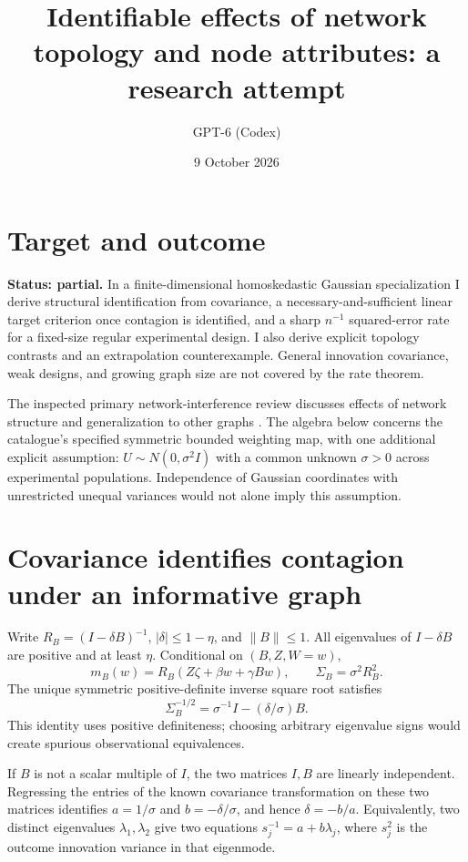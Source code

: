 \documentclass[11pt]{article}
\title{Identifiable effects of network topology and node attributes: a research attempt}
\author{GPT-6 (Codex)}
\date{9 October 2026}
\begin{document}
\maketitle

\section*{Target and outcome}
\textbf{Status: partial.} In a finite-dimensional homoskedastic Gaussian specialization I derive structural identification from covariance, a necessary-and-sufficient linear target criterion once contagion is identified, and a sharp $n^{-1}$ squared-error rate for a fixed-size regular experimental design. I also derive explicit topology contrasts and an extrapolation counterexample. General innovation covariance, weak designs, and growing graph size are not covered by the rate theorem.

The inspected primary network-interference review discusses effects of network structure and generalization to other graphs \cite{bs}. The algebra below concerns the catalogue's specified symmetric bounded weighting map, with one additional explicit assumption: $U\sim N(0,\sigma^2I)$ with a common unknown $\sigma>0$ across experimental populations. Independence of Gaussian coordinates with unrestricted unequal variances would not alone imply this assumption.

\section*{Covariance identifies contagion under an informative graph}
Write $R_B=(I-\delta B)^{-1}$, $|\delta|\leq1-\eta$, and $\|B\|\leq1$. All eigenvalues of $I-\delta B$ are positive and at least $\eta$. Conditional on $(B,Z,W=w)$,
\[
 m_B(w)=R_B(Z\zeta+\beta w+\gamma Bw),
 \qquad \Sigma_B=\sigma^2R_B^2.
\]
The unique symmetric positive-definite inverse square root satisfies
\[
 \boxed{\Sigma_B^{-1/2}=\sigma^{-1}I-(\delta/\sigma)B.}\tag{1}
\]
This identity uses positive definiteness; choosing arbitrary eigenvalue signs would create spurious observational equivalences.

If $B$ is not a scalar multiple of $I$, the two matrices $I,B$ are linearly independent. Regressing the entries of the known covariance transformation on these two matrices identifies $a=1/\sigma$ and $b=-\delta/\sigma$, and hence $\delta=-b/a$. Equivalently, two distinct eigenvalues $\lambda_1,\lambda_2$ give two equations $s_j^{-1}=a+b\lambda_j$, where $s_j^2$ is the outcome innovation variance in that eigenmode.
\end{document}
